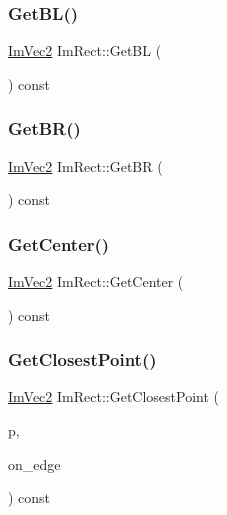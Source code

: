 \hypertarget{struct_im_rect_a59d9751bc7be6745dddf5b83b9155669}{}\label{struct_im_rect_a59d9751bc7be6745dddf5b83b9155669} 
\subsubsection{\texorpdfstring{Get\+B\+L()}{GetBL()}}
{\footnotesize\ttfamily \hyperlink{struct_im_vec2}{Im\+Vec2} Im\+Rect\+::\+Get\+BL (\begin{DoxyParamCaption}{ }\end{DoxyParamCaption}) const}

\hypertarget{struct_im_rect_ad2f2687254beed5a9b19bde0d6fa14f5}{}\label{struct_im_rect_ad2f2687254beed5a9b19bde0d6fa14f5} 
\subsubsection{\texorpdfstring{Get\+B\+R()}{GetBR()}}
{\footnotesize\ttfamily \hyperlink{struct_im_vec2}{Im\+Vec2} Im\+Rect\+::\+Get\+BR (\begin{DoxyParamCaption}{ }\end{DoxyParamCaption}) const}

\hypertarget{struct_im_rect_aae13f8003184fd84f29d27c3c074cf43}{}\label{struct_im_rect_aae13f8003184fd84f29d27c3c074cf43} 
\subsubsection{\texorpdfstring{Get\+Center()}{GetCenter()}}
{\footnotesize\ttfamily \hyperlink{struct_im_vec2}{Im\+Vec2} Im\+Rect\+::\+Get\+Center (\begin{DoxyParamCaption}{ }\end{DoxyParamCaption}) const}

\hypertarget{struct_im_rect_a223c67d4c93e5c87a33a68ebb527bbb8}{}\label{struct_im_rect_a223c67d4c93e5c87a33a68ebb527bbb8} 
\subsubsection{\texorpdfstring{Get\+Closest\+Point()}{GetClosestPoint()}}
{\footnotesize\ttfamily \hyperlink{struct_im_vec2}{Im\+Vec2} Im\+Rect\+::\+Get\+Closest\+Point (\begin{DoxyParamCaption}\item[{\hyperlink{struct_im_vec2}{Im\+Vec2}}]{p,  }\item[{bool}]{on\+\_\+edge }\end{DoxyParamCaption}) const}


